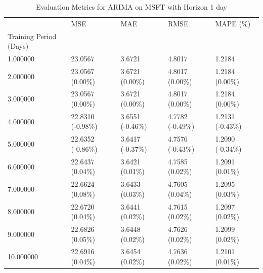 \begin{table}
\caption{Evaluation Metrics for ARIMA on MSFT with Horizon 1 day}
\label{tab:arima_MSFT_h1_metrics}
\begin{tabular}{lllll}
\toprule
 & MSE & MAE & RMSE & MAPE (\%) \\
Training Period (Days) &  &  &  &  \\
\midrule
1.000000 & 23.0567 & 3.6721 & 4.8017 & 1.2184 \\
2.000000 & 23.0567 (0.00\%) & 3.6721 (0.00\%) & 4.8017 (0.00\%) & 1.2184 (0.00\%) \\
3.000000 & 23.0567 (0.00\%) & 3.6721 (0.00\%) & 4.8017 (0.00\%) & 1.2184 (0.00\%) \\
4.000000 & 22.8310 (-0.98\%) & 3.6551 (-0.46\%) & 4.7782 (-0.49\%) & 1.2131 (-0.43\%) \\
5.000000 & 22.6352 (-0.86\%) & 3.6417 (-0.37\%) & 4.7576 (-0.43\%) & 1.2090 (-0.34\%) \\
6.000000 & 22.6437 (0.04\%) & 3.6421 (0.01\%) & 4.7585 (0.02\%) & 1.2091 (0.01\%) \\
7.000000 & 22.6624 (0.08\%) & 3.6433 (0.03\%) & 4.7605 (0.04\%) & 1.2095 (0.03\%) \\
8.000000 & 22.6720 (0.04\%) & 3.6441 (0.02\%) & 4.7615 (0.02\%) & 1.2097 (0.02\%) \\
9.000000 & 22.6826 (0.05\%) & 3.6448 (0.02\%) & 4.7626 (0.02\%) & 1.2099 (0.02\%) \\
10.000000 & 22.6916 (0.04\%) & 3.6454 (0.02\%) & 4.7636 (0.02\%) & 1.2101 (0.01\%) \\
\bottomrule
\end{tabular}
\end{table}
